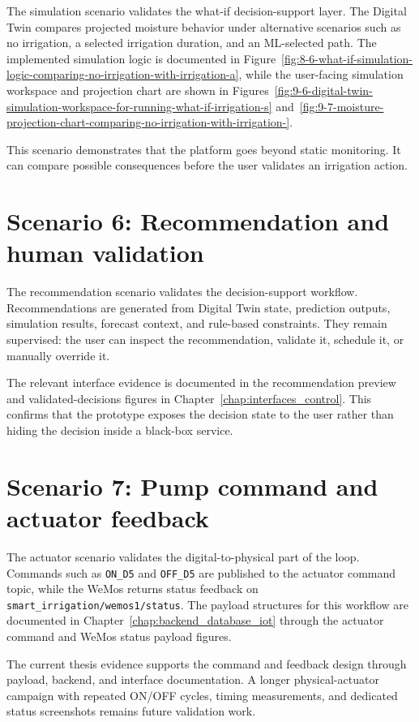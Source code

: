 The simulation scenario validates the what-if decision-support layer. The Digital Twin compares projected moisture behavior under alternative scenarios such as no irrigation, a selected irrigation duration, and an ML-selected path. The implemented simulation logic is documented in Figure~\ref{fig:8-6-what-if-simulation-logic-comparing-no-irrigation-with-irrigation-a}, while the user-facing simulation workspace and projection chart are shown in Figures~\ref{fig:9-6-digital-twin-simulation-workspace-for-running-what-if-irrigation-s} and~\ref{fig:9-7-moisture-projection-chart-comparing-no-irrigation-with-irrigation-}.

This scenario demonstrates that the platform goes beyond static monitoring. It can compare possible consequences before the user validates an irrigation action.

\section{Scenario 6: Recommendation and human validation}

The recommendation scenario validates the decision-support workflow. Recommendations are generated from Digital Twin state, prediction outputs, simulation results, forecast context, and rule-based constraints. They remain supervised: the user can inspect the recommendation, validate it, schedule it, or manually override it.

The relevant interface evidence is documented in the recommendation preview and validated-decisions figures in Chapter~\ref{chap:interfaces_control}. This confirms that the prototype exposes the decision state to the user rather than hiding the decision inside a black-box service.

\section{Scenario 7: Pump command and actuator feedback}

The actuator scenario validates the digital-to-physical part of the loop. Commands such as \texttt{ON\_D5} and \texttt{OFF\_D5} are published to the actuator command topic, while the WeMos returns status feedback on \texttt{smart\_irrigation/wemos1/status}. The payload structures for this workflow are documented in Chapter~\ref{chap:backend_database_iot} through the actuator command and WeMos status payload figures.

The current thesis evidence supports the command and feedback design through payload, backend, and interface documentation. A longer physical-actuator campaign with repeated ON/OFF cycles, timing measurements, and dedicated status screenshots remains future validation work.

